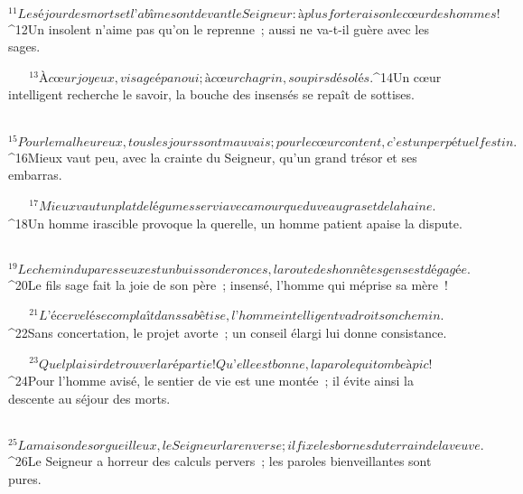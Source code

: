            
         
${}^{11}Le séjour des morts et l’abîme sont devant le Seigneur :
        à plus forte raison le cœur des hommes !
        
           
         
${}^{12}Un insolent n’aime pas qu’on le reprenne ;
        aussi ne va-t-il guère avec les sages.
        
           
         
${}^{13}À cœur joyeux, visage épanoui ;
        à cœur chagrin, soupirs désolés.
        
           
         
${}^{14}Un cœur intelligent recherche le savoir,
        la bouche des insensés se repaît de sottises.
        
           
         
${}^{15}Pour le malheureux, tous les jours sont mauvais ;
        pour le cœur content, c’est un perpétuel festin.
        
           
         
${}^{16}Mieux vaut peu, avec la crainte du Seigneur,
        qu’un grand trésor et ses embarras.
        
           
         
${}^{17}Mieux vaut un plat de légumes servi avec amour
        que du veau gras et de la haine.
        
           
         
${}^{18}Un homme irascible provoque la querelle,
        un homme patient apaise la dispute.
        
           
         
${}^{19}Le chemin du paresseux est un buisson de ronces,
        la route des honnêtes gens est dégagée.
        
           
         
${}^{20}Le fils sage fait la joie de son père ;
        insensé, l’homme qui méprise sa mère !
        
           
         
${}^{21}L’écervelé se complaît dans sa bêtise,
        l’homme intelligent va droit son chemin.
        
           
         
${}^{22}Sans concertation, le projet avorte ;
        un conseil élargi lui donne consistance.
        
           
         
${}^{23}Quel plaisir de trouver la répartie !
        Qu’elle est bonne, la parole qui tombe à pic !
        
           
         
${}^{24}Pour l’homme avisé, le sentier de vie est une montée ;
        il évite ainsi la descente au séjour des morts.
        
           
         
${}^{25}La maison des orgueilleux, le Seigneur la renverse ;
        il fixe les bornes du terrain de la veuve.
        
           
         
${}^{26}Le Seigneur a horreur des calculs pervers ;
        les paroles bienveillantes sont pures.
        
